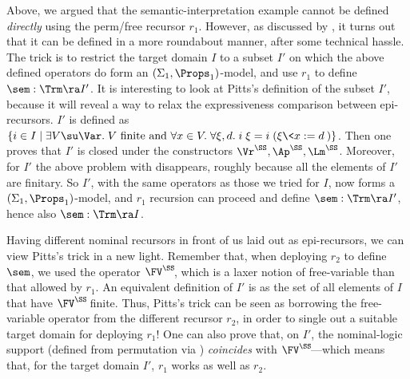 Above, we argued that the semantic-interpretation example cannot be defined \emph{directly} using the perm/free recursor $r_1$. 
However, as discussed by %
\citet[\S 6.3]{pitts-AlphaStructural}, it turns out that it can be defined in a more roundabout manner, after some technical hassle. %
The trick %
is to restrict the target domain $I$ to a subset $I'$ on which the above defined operators do form an $(\Sigma_1,\Props_1)$-model, and use $r_1$ to define $\sem : \Trm \ra I'$. 
It is interesting to look at Pitts's definition of the subset $I'$, because it will reveal %
a way to relax the expressiveness comparison between epi-recursors.  
$I'$ is defined as 
$\{i \in I \mid \exists V \su \Var.\; V \mbox{ finite and } \forall x\in V.\;\forall \xi,d.\;i\;\xi = i\;(\xi\<x :=d\>)\}$. %
Then one proves that $I'$ is closed under the constructors $\Vr^\SS,\Ap^\SS,\Lm^\SS$. Moreover, for $I'$ the above problem with \FCB{} disappears, roughly because all the elements of $I'$ are finitary. So $I'$, with the same operators as those we tried for $I$, now forms a $(\Sigma_1,\Props_1)$-model, and $r_1$ recursion can proceed and define $\sem : \Trm \ra I'$, hence also $\sem : \Trm \ra I$. 

Having %
different nominal recursors in front of us laid out as epi-recursors, we can view Pitts's %
trick in a new light. Remember that, when deploying $r_2$ to define $\sem$, we used the operator 
$\FV^\SS\!$, which is a laxer notion of free-variable %
than that allowed by  
$r_1$. %
An equivalent definition of $I'$ is as the set of all elements of $I$ that have $\FV^\SS\!$ finite. 
Thus, Pitts's trick can be seen as borrowing the free-variable operator from the different recursor $r_2$, in order to single out a suitable target domain for deploying $r_1$! 
%
One can also prove 
that, on $I'$, the nominal-logic support (defined from permutation via  \FvDPm{}) \emph{coincides} with $\FV^\SS\!$---which means that, for the target domain $I'$, 
$r_1$ works as well as $r_2$.

